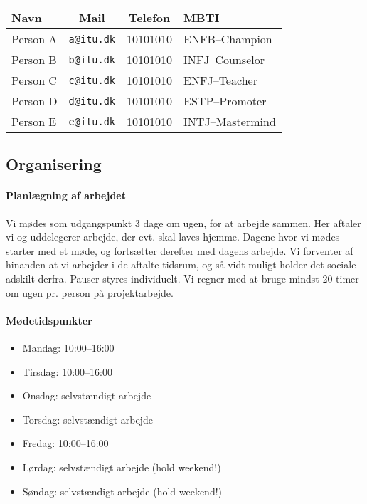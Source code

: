 \documentclass[11pt]{article}
\begin{document}
\begin{table}[h!]
    \centering
    \begin{tabular}{l c c l}
        \textbf{Navn} & \textbf{Mail} & \textbf{Telefon} & \textbf{MBTI} \\ \hline
        Person A & \texttt{a@itu.dk} & 10101010 & ENFB--Champion \\
        Person B & \texttt{b@itu.dk} & 10101010 & INFJ--Counselor \\
        Person C & \texttt{c@itu.dk} & 10101010 & ENFJ--Teacher \\
        Person D & \texttt{d@itu.dk} & 10101010 & ESTP--Promoter \\
        Person E & \texttt{e@itu.dk} & 10101010 & INTJ--Mastermind \\
    \end{tabular}
\end{table}

\subsection{Organisering}

\paragraph{Planlægning af arbejdet}
Vi mødes som udgangspunkt 3 dage om ugen, for at arbejde sammen. Her aftaler vi og uddelegerer arbejde, der evt. skal laves hjemme.
Dagene hvor vi mødes starter med et møde, og fortsætter derefter med dagens arbejde.
Vi forventer af hinanden at vi arbejder i de aftalte tidsrum, og så vidt muligt holder det sociale adskilt derfra. Pauser styres individuelt.
Vi regner med at bruge mindst 20 timer om ugen pr. person på projektarbejde.

\paragraph{Mødetidspunkter}

\begin{itemize}
    \item Mandag: 10:00--16:00
    \item Tirsdag: 10:00--16:00
    \item Onsdag: selvstændigt arbejde
    \item Torsdag: selvstændigt arbejde
    \item Fredag: 10:00--16:00
    \item Lørdag: selvstændigt arbejde (hold weekend!)
    \item Søndag: selvstændigt arbejde (hold weekend!)
\end{itemize}
\end{document}
